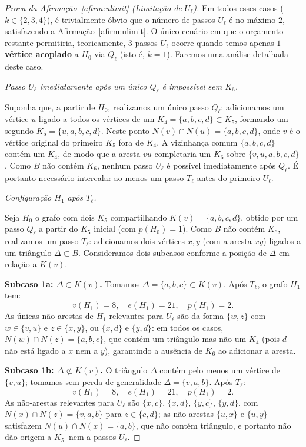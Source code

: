 \documentclass[reqno, 12pt]{amsart}
\numberwithin{equation}{section}
\theoremstyle{plain}
\theoremstyle{definition}
\begin{document}
\begin{proof}[Prova da Afirmação~\ref{afirm:ulimit} (Limitação de $U_\ell$)]
Em todos esses casos ($k \in \{2, 3, 4\}$), é trivialmente óbvio que o número de passos $U_\ell$ é no máximo $2$, satisfazendo a Afirmação~\ref{afirm:ulimit}. O único cenário em que o orçamento restante permitiria, teoricamente, $3$ passos $U_\ell$ ocorre quando temos apenas \textbf{$1$ vértice acoplado} a $H_0$ via $Q_\ell$ (isto é, $k = 1$). Faremos uma análise detalhada deste caso.

\medskip
\noindent\textit{Passo $U_\ell$ imediatamente após um único $Q_\ell$ é impossível sem $K_6$.}

Suponha que, a partir de $H_0$, realizamos um único passo $Q_\ell$: adicionamos um vértice $u$
ligado a todos os vértices de um $K_4 = \{a,b,c,d\} \subset K_5$, formando um segundo
$K_5 = \{u,a,b,c,d\}$. Neste ponto $N(v) \cap N(u) = \{a,b,c,d\}$, onde $v$ é o vértice
original do primeiro $K_5$ fora de $K_4$. A vizinhança comum $\{a,b,c,d\}$ contém
um $K_4$, de modo que a aresta $vu$ completaria um $K_6$ sobre $\{v,u,a,b,c,d\}$. Como
$B$ não contém $K_6$, nenhum passo $U_\ell$ é possível imediatamente após $Q_\ell$.
É portanto necessário intercalar ao menos um passo $T_\ell$ antes do primeiro $U_\ell$.

\medskip
\noindent\textit{Configuração $H_1$ após $T_\ell$.}

Seja $H_0$ o grafo com dois $K_5$ compartilhando $K(v) = \{a,b,c,d\}$, obtido por um
passo $Q_\ell$ a partir do $K_5$ inicial (com $p(H_0) = 1$). Como $B$ não contém $K_6$,
realizamos um passo $T_\ell$: adicionamos dois vértices $x, y$ (com a aresta $xy$) ligados
a um triângulo $\Delta \subset B$. Consideramos dois subcasos conforme a posição de
$\Delta$ em relação a $K(v)$.

\medskip
\noindent\textbf{Subcaso 1a: $\Delta \subset K(v)$.}
Tomamos $\Delta = \{a,b,c\} \subset K(v)$. Após $T_\ell$, o grafo $H_1$ tem:
\[
    v(H_1) = 8,\quad e(H_1) = 21,\quad p(H_1) = 2.
\]
As únicas não-arestas de $H_1$ relevantes para $U_\ell$ são da forma $\{w, z\}$
com $w \in \{v, u\}$ e $z \in \{x, y\}$, ou $\{x,d\}$ e $\{y,d\}$: em todos os
casos, $N(w) \cap N(z) = \{a,b,c\}$, que contém um triângulo mas não um $K_4$
(pois $d$ não está ligado a $x$ nem a $y$), garantindo a ausência de $K_6$ ao
adicionar a aresta.

\medskip
\noindent\textbf{Subcaso 1b: $\Delta \not\subset K(v)$.}
O triângulo $\Delta$ contém pelo menos um vértice de $\{v,u\}$; tomamos sem perda
de generalidade $\Delta = \{v,a,b\}$. Após $T_\ell$:
\[
    v(H_1) = 8,\quad e(H_1) = 21,\quad p(H_1) = 2.
\]
As não-arestas relevantes para $U_\ell$ são $\{x,c\}$, $\{x,d\}$, $\{y,c\}$, $\{y,d\}$,
com $N(x) \cap N(z) = \{v,a,b\}$ para $z \in \{c,d\}$; as não-arestas $\{u,x\}$ e $\{u,y\}$
satisfazem $N(u) \cap N(x) = \{a,b\}$, que não contém triângulo, e portanto não dão
origem a $K_5^-$ nem a passos $U_\ell$.


\end{proof}
\end{document}
